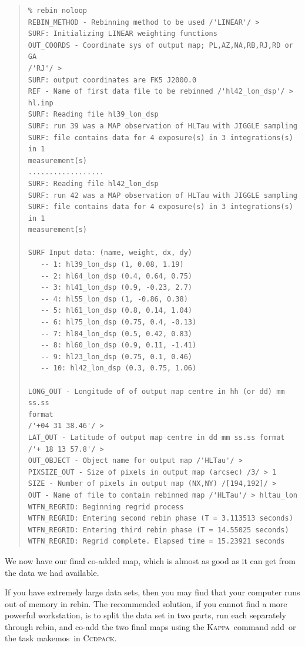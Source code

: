 \documentclass[twoside,11pt]{article}
\newenvironment{myquote}{\begin{quote}\begin{small}}{\end{small}\end{quote}}
\newcommand{\Kappa}{\xref{\textsc{Kappa}}{sun95}{}}
\newcommand{\ccdpack}{\xref{\textsc{Ccdpack}}{sun139}{}}
\newcommand{\task}[1]{\textsf{#1}}
\newcommand{\rebin}{\xref{\task{rebin}}{sun216}{REBIN}}
\newcommand{\add}{\xref{\task{add}}{sun95}{ADD}}
\newcommand{\makemos}{\xref{\task{makemos}}{sun139}{MAKEMOS}}
\newcommand{\xref}[3]{#1}
\renewcommand{\_}{\texttt{\symbol{95}}}
\begin{document}
\begin{myquote}
\begin{verbatim}
% rebin noloop
REBIN_METHOD - Rebinning method to be used /'LINEAR'/ > 
SURF: Initializing LINEAR weighting functions
OUT_COORDS - Coordinate sys of output map; PL,AZ,NA,RB,RJ,RD or GA 
/'RJ'/ > 
SURF: output coordinates are FK5 J2000.0
REF - Name of first data file to be rebinned /'hl42_lon_dsp'/ > 
hl.inp
SURF: Reading file hl39_lon_dsp
SURF: run 39 was a MAP observation of HLTau with JIGGLE sampling
SURF: file contains data for 4 exposure(s) in 3 integrations(s) in 1
measurement(s)
..................
SURF: Reading file hl42_lon_dsp
SURF: run 42 was a MAP observation of HLTau with JIGGLE sampling
SURF: file contains data for 4 exposure(s) in 3 integrations(s) in 1
measurement(s)
 
SURF Input data: (name, weight, dx, dy)
   -- 1: hl39_lon_dsp (1, 0.08, 1.19)
   -- 2: hl64_lon_dsp (0.4, 0.64, 0.75)
   -- 3: hl41_lon_dsp (0.9, -0.23, 2.7)
   -- 4: hl55_lon_dsp (1, -0.86, 0.38)
   -- 5: hl61_lon_dsp (0.8, 0.14, 1.04)
   -- 6: hl75_lon_dsp (0.75, 0.4, -0.13)
   -- 7: hl84_lon_dsp (0.5, 0.42, 0.83)
   -- 8: hl60_lon_dsp (0.9, 0.11, -1.41)
   -- 9: hl23_lon_dsp (0.75, 0.1, 0.46)
   -- 10: hl42_lon_dsp (0.3, 0.75, 1.06)

LONG_OUT - Longitude of of output map centre in hh (or dd) mm ss.ss 
format
/'+04 31 38.46'/ > 
LAT_OUT - Latitude of output map centre in dd mm ss.ss format 
/'+ 18 13 57.8'/ > 
OUT_OBJECT - Object name for output map /'HLTau'/ > 
PIXSIZE_OUT - Size of pixels in output map (arcsec) /3/ > 1
SIZE - Number of pixels in output map (NX,NY) /[194,192]/ > 
OUT - Name of file to contain rebinned map /'HLTau'/ > hltau_lon
WTFN_REGRID: Beginning regrid process
WTFN_REGRID: Entering second rebin phase (T = 3.113513 seconds)
WTFN_REGRID: Entering third rebin phase (T = 14.55025 seconds)
WTFN_REGRID: Regrid complete. Elapsed time = 15.23921 seconds
\end{verbatim}
\end{myquote}

We now have our final co-added map, which is almost as good as it
can get from the data we had available.

If you have extremely large data sets, then you may find that your
computer runs out of memory in \rebin.  The recommended solution, if
you cannot find a more powerful workstation, is to split the data set
in two parts, run each separately through \rebin, and co-add the two
final maps using the \Kappa\ command \add\ or the task \makemos\ in
\ccdpack.
\end{document}
